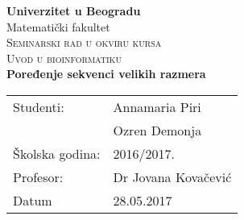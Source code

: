 \documentclass[a4paper,12pt]{report}
\begin{document}
\renewcommand*\contentsname{ }

\begin{titlepage}
\begin{center}

	\textbf{\Large Univerzitet u Beogradu}\\[0.5cm]
	
	{\large Matematički fakultet}\\[6cm]
	
	\textsc{\small Seminarski rad u okviru kursa\\Uvod u bioinformatiku}\\[0.5cm]
	
	
	\textbf{\Large Poređenje sekvenci velikih razmera}\\[10cm]

	\begin{tabular}{|l|l|}
  		\hline
	    Studenti: & Annamaria Piri \\ \cline{2-2}
	              & Ozren Demonja \\ \hline
	    Školska godina: & 2016/2017. \\ \hline
	    Profesor: & Dr Jovana Kovačević	 \\ \hline
	    Datum &  28.05.2017 \\ \hline
	\end{tabular}

\newpage
\end{center}
\end{titlepage}








%

%

%
\end{document}
